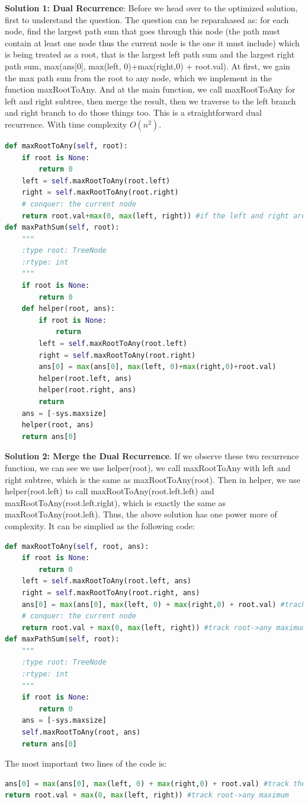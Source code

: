 \documentclass[../main.tex]{subfiles}
\begin{document}
\begin{examples}[resume]
\textbf{Solution 1: Dual Recurrence}: Before we head over to the optimized solution, first to understand the question. The question can be reparahased as: for each node, find the largest path sum that goes through this node (the path must contain at least one node thus the current node is the one it must include) which is being treated as a root, that is the largest left path sum and the largest right path sum, max(ans[0], max(left, 0)+max(right,0) + root.val). At first, we gain the max path sum from the root to any node, which we implement in the function maxRootToAny. And at the main function, we call maxRootToAny for left and right subtree, then merge the result, then we traverse to the left branch and right branch to do those things too. This is a straightforward dual recurrence. With time complexity $O(n^2)$.
\begin{lstlisting}[language=Python]
def maxRootToAny(self, root):
    if root is None:
        return 0
    left = self.maxRootToAny(root.left)
    right = self.maxRootToAny(root.right)
    # conquer: the current node
    return root.val+max(0, max(left, right)) #if the left and right are both negative, we get rid of it
def maxPathSum(self, root):
    """
    :type root: TreeNode
    :rtype: int
    """
    if root is None:
        return 0
    def helper(root, ans):
        if root is None:
            return
        left = self.maxRootToAny(root.left)
        right = self.maxRootToAny(root.right)
        ans[0] = max(ans[0], max(left, 0)+max(right,0)+root.val)
        helper(root.left, ans)
        helper(root.right, ans)
        return 
    ans = [-sys.maxsize]
    helper(root, ans)
    return ans[0]
\end{lstlisting}
\textbf{Solution 2: Merge the Dual Recurrence}. If we observe these two recurrence function, we can see we use helper(root), we call maxRootToAny with left and right subtree, which is the same as maxRootToAny(root). Then in helper, we use helper(root.left) to call maxRootToAny(root.left.left) and maxRootToAny(root.left.right), which is exactly the same as maxRootToAny(root.left). Thus, the above solution has one power more of complexity. It can be simplied as the following code:
\begin{lstlisting}[language=Python]
def maxRootToAny(self, root, ans):
    if root is None:
        return 0
    left = self.maxRootToAny(root.left, ans)
    right = self.maxRootToAny(root.right, ans)
    ans[0] = max(ans[0], max(left, 0) + max(right,0) + root.val) #track the any->root->any maximum
    # conquer: the current node
    return root.val + max(0, max(left, right)) #track root->any maximum
def maxPathSum(self, root):
    """
    :type root: TreeNode
    :rtype: int
    """
    if root is None:
        return 0
    ans = [-sys.maxsize]
    self.maxRootToAny(root, ans)
    return ans[0]
\end{lstlisting}
The most important two lines of the code is:
\begin{lstlisting}[language=Python]
ans[0] = max(ans[0], max(left, 0) + max(right,0) + root.val) #track the any->root->any maximum
return root.val + max(0, max(left, right)) #track root->any maximum
\end{lstlisting}
\end{examples}
\end{document}
